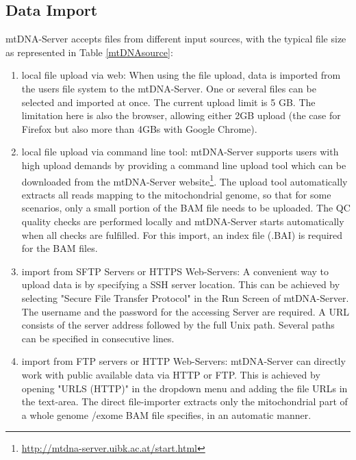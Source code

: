 \subsection{Data Import}
mtDNA-Server accepts files from different input sources, with the typical file size as represented in Table \ref{mtDNAsource}: 
\begin{enumerate}[label=(\alph*)]
\item   local file upload via web: When using the file upload, data is imported from the users file system to the mtDNA-Server. One or several files can be selected and imported at once. The current upload limit is 5 GB. The limitation here is also the browser, allowing either 2GB upload (the case for Firefox but also more than 4GBs with Google Chrome). 
\item   local file upload via command line tool: mtDNA-Server supports users with high upload demands by providing a command line upload tool which can be downloaded from the mtDNA-Server website\footnote{\url{http://mtdna-server.uibk.ac.at/start.html}}. The upload tool automatically extracts all reads mapping to the mitochondrial genome, so that for some scenarios, only a small portion of the BAM file needs to be uploaded. The QC quality checks are performed locally and mtDNA-Server starts automatically when all checks are fulfilled. For this import, an index file (.BAI) is required for the BAM files. 
\item   import from SFTP Servers or HTTPS Web-Servers: A convenient way to upload data is by specifying a SSH server location. This can be achieved by selecting "Secure File Transfer Protocol" in the Run Screen of mtDNA-Server. The username and the password for the accessing Server are required. A URL consists of the server address followed by the full Unix path. Several paths can be specified in consecutive lines.
\item   import from FTP servers or HTTP Web-Servers: mtDNA-Server can directly work with public available data via HTTP or FTP. This is achieved by opening "URLS (HTTP)" in the dropdown menu and adding the file URLs in the text-area. The direct file-importer extracts only the mitochondrial part of a whole genome /exome BAM file specifies, in an automatic manner. 
\end{enumerate}

